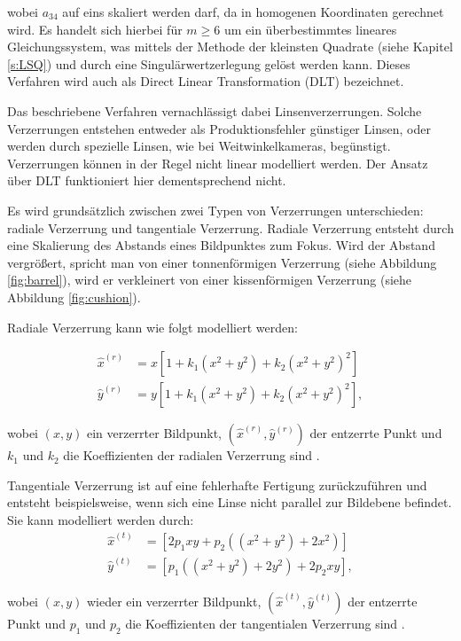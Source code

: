 wobei $a_{34}$ auf eins skaliert werden darf, da in homogenen Koordinaten gerechnet wird. Es handelt sich hierbei für $m \geq 6$ um ein überbestimmtes lineares Gleichungssystem, was mittels der Methode der kleinsten Quadrate (siehe Kapitel \ref{s:LSQ}) und durch eine Singulärwertzerlegung gelöst werden kann.
Dieses Verfahren wird auch als Direct Linear Transformation (DLT) bezeichnet.

Das beschriebene Verfahren vernachlässigt dabei Linsenverzerrungen. Solche Verzerrungen entstehen entweder als Produktionsfehler günstiger Linsen, oder werden durch spezielle Linsen, wie bei Weitwinkelkameras, begünstigt. Verzerrungen können in der Regel nicht linear modelliert werden. Der Ansatz über DLT funktioniert hier dementsprechend nicht.

Es wird grundsätzlich zwischen zwei Typen von Verzerrungen unterschieden: radiale Verzerrung und tangentiale Verzerrung.
Radiale Verzerrung entsteht durch eine Skalierung des Abstands eines Bildpunktes zum Fokus. Wird der Abstand vergrößert, spricht man von einer tonnenförmigen Verzerrung (siehe Abbildung \ref{fig:barrel}), wird er verkleinert von einer kissenförmigen Verzerrung (siehe Abbildung \ref{fig:cushion}).

Radiale Verzerrung kann wie folgt modelliert werden:

\[
\begin{aligned}
\hat{x}^{(r)} &= x\left[1 + k_1\left(x^2 + y^2\right) + k_2\left(x^2 + y^2\right)^2 \right] \\
\hat{y}^{(r)} &= y\left[1 + k_1\left(x^2 + y^2\right) + k_2\left(x^2 + y^2\right)^2 \right],
\end{aligned}
\]

wobei $(x,y)$ ein verzerrter Bildpunkt, $(\hat{x}^{(r)}, \hat{y}^{(r)})$ der entzerrte Punkt und $k_1$ und $k_2$ die Koeffizienten der radialen Verzerrung sind \cite{Zhang2002}.

Tangentiale Verzerrung ist auf eine fehlerhafte Fertigung zurückzuführen und entsteht beispielsweise, wenn sich eine Linse nicht parallel zur Bildebene befindet.
Sie kann modelliert werden durch:
\[
\begin{aligned}
\hat{x}^{(t)} &= \left[2p_1xy + p_2\left((x^2 + y^2) + 2x^2\right)\right] \\
\hat{y}^{(t)} &= \left[p_1\left((x^2 + y^2) + 2y^2\right) + 2p_2xy\right],
\end{aligned}
\]

wobei $(x,y)$ wieder ein verzerrter Bildpunkt, $(\hat{x}^{(t)}, \hat{y}^{(t)})$ der entzerrte Punkt und $p_1$ und $p_2$ die Koeffizienten der tangentialen Verzerrung sind \cite{Heikkila1997}.

